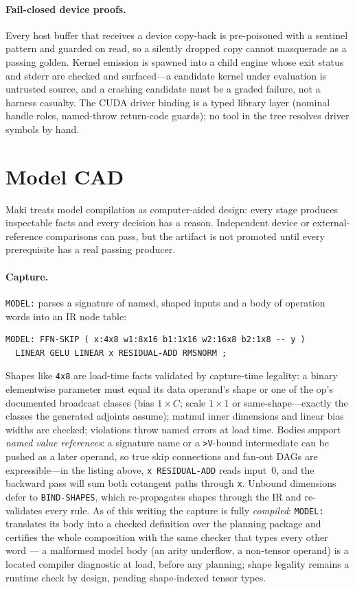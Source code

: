\documentclass[11pt]{article}
\newcommand{\code}[1]{\texttt{#1}}
\begin{document}
\paragraph{Fail-closed device proofs.} Every host buffer that receives a
device copy-back is pre-poisoned with a sentinel pattern and guarded on
read, so a silently dropped copy cannot masquerade as a passing golden.
Kernel emission is spawned into a child engine whose exit status and
stderr are checked and surfaced---a candidate kernel under evaluation is
untrusted source, and a crashing candidate must be a graded failure, not
a harness casualty. The CUDA driver binding is a typed library layer
(nominal handle roles, named-throw return-code guards); no tool in the
tree resolves driver symbols by hand.

\section{Model CAD}\label{sec:cad}
Maki treats model compilation as computer-aided design: every stage
produces inspectable facts and every decision has a reason. Independent
device or external-reference comparisons can pass, but the artifact is not
promoted until every prerequisite has a real passing producer.

\paragraph{Capture.} \code{MODEL:} parses a signature of named, shaped
inputs and a body of operation words into an IR node table:
\begin{verbatim}
MODEL: FFN-SKIP ( x:4x8 w1:8x16 b1:1x16 w2:16x8 b2:1x8 -- y )
  LINEAR GELU LINEAR x RESIDUAL-ADD RMSNORM ;
\end{verbatim}
Shapes like \code{4x8} are load-time facts validated by capture-time
legality: a binary elementwise parameter must equal its data operand's
shape or one of the op's documented broadcast classes (bias
$1{\times}C$; scale $1{\times}1$ or same-shape---exactly the classes the
generated adjoints assume); matmul inner dimensions and linear bias
widths are checked; violations throw named errors at load time. Bodies
support \emph{named value references}: a signature name or a
\code{>V}-bound intermediate can be pushed as a later operand, so true
skip connections and fan-out DAGs are expressible---in the listing above,
\code{x RESIDUAL-ADD} reads input~0, and the backward pass will sum both
cotangent paths through \code{x}. Unbound dimensions defer to
\code{BIND-SHAPES}, which re-propagates shapes through the IR and
re-validates every rule. As of this writing the capture is fully
\emph{compiled}: \code{MODEL:} translates its body into a checked
definition over the planning package and certifies the whole composition
with the same checker that types every other word --- a malformed model
body (an arity underflow, a non-tensor operand) is a located compiler
diagnostic at load, before any planning; shape legality remains a
runtime check by design, pending shape-indexed tensor types.
\end{document}

